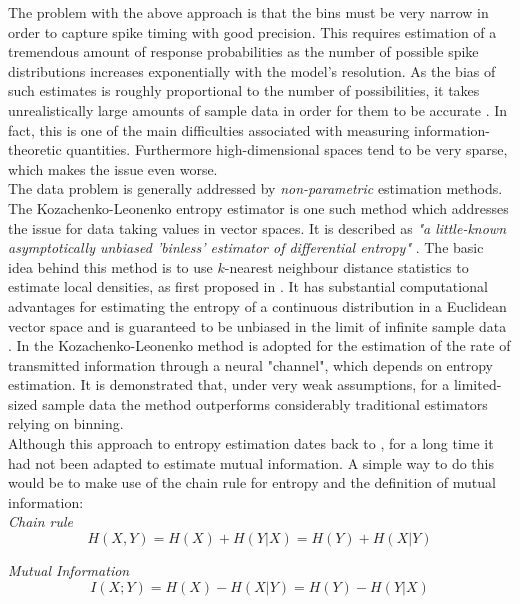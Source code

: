 \documentclass[12pt]{extarticle}
\begin{document}
\noindent
The problem with the above approach is that the bins must be very narrow in order to capture spike timing with good precision. This requires estimation of a tremendous amount of response probabilities as the number of possible spike distributions increases exponentially with the model's resolution. As the bias of such estimates is roughly proportional to the number of possibilities, it takes unrealistically large amounts of sample data in order for them to be accurate \cite{VJ02}. In fact, this is one of the main difficulties associated with measuring information-theoretic quantities. Furthermore high-dimensional spaces tend to be very sparse, which makes the issue even worse.\\

\noindent
The data problem is generally addressed by \textit{non-parametric} estimation methods. 
The Kozachenko-Leonenko entropy estimator \cite{KL} is one such method which addresses the issue for data taking values in vector spaces. It is described as \textit{"a little-known asymptotically unbiased 'binless' estimator of differential entropy"} \cite{VJ02}. The basic idea behind this method is to use $k$-nearest neighbour distance statistics to estimate local densities, as first proposed in \cite{DOBR}. It has substantial computational advantages for estimating the entropy of a continuous distribution in a Euclidean vector space and is guaranteed to be unbiased in the limit of infinite sample data \cite{KL}. In \cite{VJ02} the Kozachenko-Leonenko method is adopted for the estimation of the rate of transmitted information through a neural "channel", which depends on entropy estimation. It is demonstrated that, under very weak assumptions, for a limited-sized sample data the method outperforms considerably traditional estimators relying on binning.\\

\noindent
Although this approach to entropy estimation dates back to \cite{DOBR}, for a long time it had not been adapted to estimate mutual information. A simple way to do this would be to make use of the chain rule for entropy and the definition of mutual information:\\

\textit{Chain rule}
\begin{equation}
H(X,Y) = H(X) + H(Y|X) = H(Y) + H(X|Y)
\end{equation}

\textit{Mutual Information}
\begin{equation}
I(X;Y) = H(X) - H(X|Y) = H(Y) - H(Y|X)
\end{equation}
\end{document}
